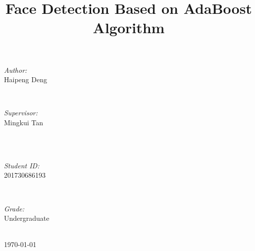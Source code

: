 \documentclass[journal, a4paper]{IEEEtran}
\begin{document}
\begin{titlepage}
\begin{minipage}{0.4\textwidth}
\begin{flushleft} \large
\emph{Author:}\\
Haipeng Deng %
\end{flushleft}
\end{minipage}
~
\begin{minipage}{0.4\textwidth}
\begin{flushright} \large
\emph{Supervisor:} \\
Mingkui Tan%
\end{flushright}
\end{minipage}\\[2cm]
~
\begin{minipage}{0.4\textwidth}
\begin{flushleft} \large
\emph{Student ID:}\\
201730686193
\end{flushleft}
\end{minipage}
~
\begin{minipage}{0.4\textwidth}
\begin{flushright} \large
\emph{Grade:} \\
Undergraduate
\end{flushright}
\end{minipage}\\[2cm]



{\large \today}\\[2cm] %



\vfill %

\end{titlepage}

	\title{Face Detection Based on AdaBoost Algorithm}
	\maketitle
\end{document}
